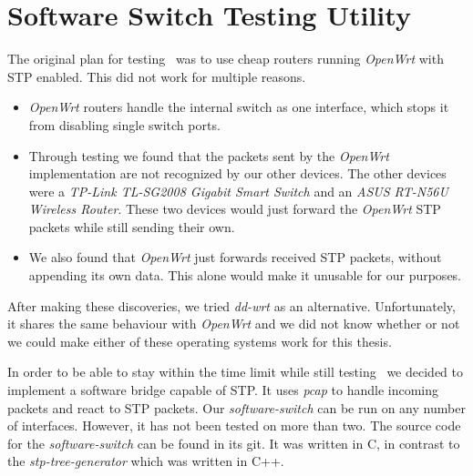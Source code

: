 \chapter{Software Switch Testing Utility}
\label{switch}
The original plan for testing \tool\ was to use cheap routers running \textit{OpenWrt}\cite{OpenWrt} with STP enabled.
This did not work for multiple reasons.
\begin{itemize}
    \item \textit{OpenWrt} routers handle the internal switch as one interface, which stops it from disabling single switch ports.
    \item Through testing we found that the packets sent by the \textit{OpenWrt} implementation are not recognized by our other devices.
    The other devices were a \textit{TP-Link TL-SG2008 Gigabit Smart Switch} and an \textit{ASUS RT-N56U Wireless Router}.
    These two devices would just forward the \textit{OpenWrt} STP packets while still sending their own.
    \item We also found that \textit{OpenWrt} just forwards received STP packets, without appending its own data.
    This alone would make it unusable for our purposes.
\end{itemize}

After making these discoveries, we tried \textit{dd-wrt}\cite{dd-wrt} as an alternative.
Unfortunately, it shares the same behaviour with \textit{OpenWrt} and we did not know whether or not we could make either of these operating systems work for this thesis.

In order to be able to stay within the time limit while still testing \tool\, we decided to implement a software bridge capable of STP.
It uses \textit{pcap} to handle incoming packets and react to STP packets.
Our \textit{software-switch} can be run on any number of interfaces.
However, it has not been tested on more than two.
The source code for the \textit{software-switch} can be found in its git\cite{soft-switch}.
It was written in C, in contrast to the \textit{stp-tree-generator} which was written in C++.

